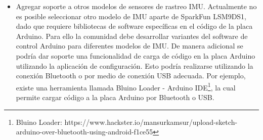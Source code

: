 \begin{itemize}
	\item	 Agregar soporte a otros modelos de sensores de rastreo IMU. Actualmente no es posible seleccionar otro modelo de IMU aparte de SparkFun LSM9DS1, dado que requiere bibliotecas de software específicas en el código de la placa Arduino. Para ello la comunidad debe desarrollar variantes del software de control Arduino para diferentes modelos de IMU. De manera adicional se podría dar soporte una funcionalidad de carga de código en la placa Arduino utilizando la aplicación de configuración. Esto podría realizarse utilizando la conexión Bluetooth o por medio de conexión USB adecuada. Por ejemplo, existe una herramienta llamada Bluino Loader - Arduino IDE\footnote{Bluino Loader: https://www.hackster.io/mansurkamsur/upload-sketch-arduino-over-bluetooth-using-android-f1ce55}, la cual permite cargar código a la placa Arduino por Bluetooth o USB.
	
\end{itemize}